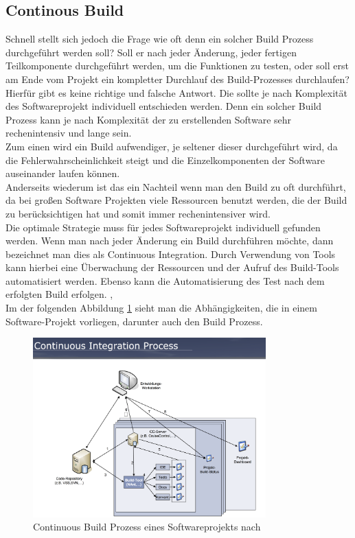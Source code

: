 \subsection{Continous Build}
Schnell stellt sich jedoch die Frage wie oft denn ein solcher Build Prozess durchgeführt werden soll? Soll er nach jeder Änderung, jeder fertigen Teilkomponente durchgeführt werden, um die Funktionen zu testen, oder soll erst am Ende vom Projekt ein kompletter Durchlauf des Build-Prozesses durchlaufen?
\\
Hierfür gibt es keine richtige und falsche Antwort. Die sollte je nach Komplexität des Softwareprojekt individuell entschieden werden. Denn ein solcher Build Prozess kann je nach Komplexität der zu erstellenden Software sehr rechenintensiv und lange sein. 
\\
Zum einen wird ein Build aufwendiger, je seltener dieser durchgeführt wird, da die Fehlerwahrscheinlichkeit steigt und die Einzelkomponenten der Software auseinander laufen können.
\\
Anderseits wiederum ist das ein Nachteil wenn man den Build zu oft durchführt, da bei großen Software Projekten viele Ressourcen benutzt werden, die der Build zu berücksichtigen hat und somit immer rechenintensiver wird.
\\
Die optimale Strategie muss für jedes Softwareprojekt individuell gefunden werden.
Wenn man nach jeder Änderung ein Build durchführen möchte, 
dann bezeichnet man dies als Continuous Integration.
Durch Verwendung von Tools kann hierbei eine Überwachung der Ressourcen und der Aufruf des Build-Tools automatisiert werden. Ebenso kann die Automatisierung des Test nach dem erfolgten Build erfolgen. \cite{build-seminar}, \cite{software-analysis}
\\
Im der folgenden Abbildung \ref{fig:ci} sieht man die Abhängigkeiten, die in einem Software-Projekt vorliegen, darunter auch den Build Prozess.

\begin{figure}[H]
	\includegraphics[width=0.8\textwidth]{img/continuousintegration.png}
	\caption{Continuous Build Prozess eines Softwareprojekts nach \cite{build-continuous}}
\label{fig:ci}
\end{figure}

